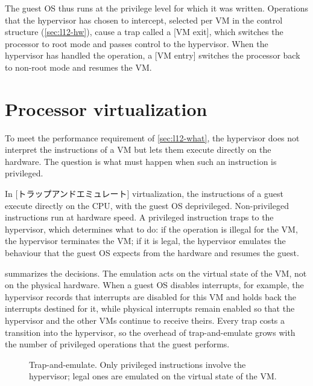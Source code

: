 \documentclass[../main.tex]{subfiles}
\begin{document}
The guest OS thus runs at the privilege level for which it was written.
Operations that the hypervisor has chosen to intercept, selected per VM in
the control structure (\cref{sec:l12-hw}), cause a trap called a
[VM exit], which switches the processor to root mode and
passes control to the hypervisor.  When the hypervisor has handled the
operation, a [VM entry] switches the processor back to
non-root mode and resumes the VM.

\section{Processor virtualization}
\label{sec:l12-cpu}

To meet the performance requirement of \cref{sec:l12-what}, the hypervisor
does not interpret the instructions of a VM but lets them execute directly
on the hardware.  The question is what must happen when such
an instruction is privileged.

\begin{definition}
  In [トラップアンドエミュレート] virtualization,
  the instructions of a guest execute directly on the CPU, with the guest
  OS deprivileged.  Non-privileged instructions run at hardware speed.  A
  privileged instruction traps to the hypervisor, which determines what to
  do: if the operation is illegal for the VM, the hypervisor terminates the
  VM; if it is legal, the hypervisor emulates the behaviour that the guest
  OS expects from the hardware and resumes the guest.
\end{definition}

 summarizes the decisions.  The emulation acts
on the virtual state of the VM, not on the physical hardware.  When a guest
OS disables interrupts, for example, the hypervisor records that interrupts
are disabled for this VM and holds back the interrupts destined for it,
while physical interrupts remain enabled so that the hypervisor and the
other VMs continue to receive theirs.  Every trap costs a transition into
the hypervisor, so the overhead of trap-and-emulate grows with the number
of privileged operations that the guest performs.

\begin{figure}[htbp]
  \centering
  
  \caption{Trap-and-emulate.  Only privileged instructions involve the
    hypervisor; legal ones are emulated on the virtual state of the VM.}
  \label{fig:l12-trap-emulate}
\end{figure}
\end{document}

